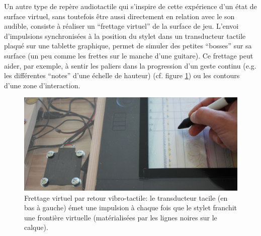 \indent Un autre type de repère audiotactile qui s'inspire de cette expérience d'un état de surface virtuel, sans toutefois être aussi directement en relation avec le son audible, consiste à réaliser un ``frettage virtuel'' de la surface de jeu. L'envoi d'impulsions synchronisées à la position du stylet dans un transducteur tactile plaqué sur une tablette graphique, permet de simuler des petites ``bosses'' sur sa surface (un peu comme les frettes sur le manche d'une guitare). Ce frettage peut aider, par exemple, à sentir les paliers dans la progression d'un geste continu (e.g. les différentes ``notes'' d'une échelle de hauteur) (cf. figure \ref{fig:interface:virtual-fretting}) ou les contours d'une zone d'interaction.\\

\begin{figure}[!htbp]
	\captionsetup{format=plain}%
	\includegraphics[width=\textwidth]{gfx/05_interfaces/virtual-fretting.jpg}
	\caption[Frettage virtuel par retour vibro-tactile]{Frettage virtuel par retour vibro-tactile: le transducteur tacile (en bas à gauche) émet une impulsion à chaque fois que le stylet franchit une frontière virtuelle (matérialisées par les lignes noires sur le calque).}
	\label{fig:interface:virtual-fretting}
\end{figure}


